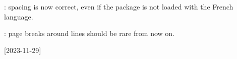 \tdocsep




\begin{tdocfix}[version = 1.0.1, date = 2023-12-08]
    \item {}: spacing is now correct, even if the  package is not loaded with the French language.

    \item {} : page breaks around  lines should be rare from now on.
\end{tdocfix}

\tdocsep




[2023-11-29]


